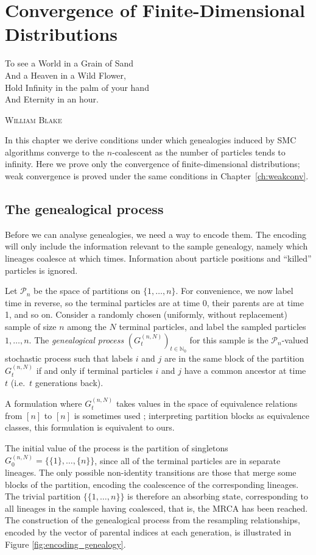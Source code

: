 \chapter{Convergence of Finite-Dimensional Distributions} %
\label{ch:limits}

\epigraph{
To see a World in a Grain of Sand\\
And a Heaven in a Wild Flower,\\
Hold Infinity in the palm of your hand\\
And Eternity in an hour.
}
{\textsc{William Blake}} 

In this chapter we derive conditions under which genealogies induced by SMC algorithms converge to the $n$-coalescent as the number of particles tends to infinity. Here we prove only the convergence of finite-dimensional distributions; weak convergence is proved under the same conditions in Chapter~\ref{ch:weakconv}.




\section{The genealogical process}
Before we can analyse genealogies, we need a way to encode them.
The encoding will only include the information relevant to the sample genealogy, namely which lineages coalesce at which times. Information about particle positions and ``killed'' particles is ignored.

Let $\mathcal{P}_n$ be the space of partitions on $\{1,\dots,n\}$.
For convenience, we now label time in reverse, so the terminal particles are at time 0, their parents are at time 1, and so on.
Consider a randomly chosen (uniformly, without replacement) sample of size $n$ among the $N$ terminal particles, and label the sampled particles $1,\dots,n$.
The \emph{genealogical process} $(G_t^{(n,N)})_{t\in\mathbb{N}_0}$ for this sample is the $\mathcal{P}_n$-valued stochastic process such that labels $i$ and $j$ are in the same block of the partition $G_t^{(n,N)}$ if and only if terminal particles $i$ and $j$ have a common ancestor at time $t$ (i.e.\ $t$ generations back).

A formulation where $G_t^{(n,N)}$ takes values in the space of equivalence relations from $[n]$ to $[n]$ is sometimes used \parencite[e.g.][]{mohle1999}; interpreting partition blocks as equivalence classes, this formulation is equivalent to ours.

The initial value of the process is the partition of singletons $G_0^{(n,N)} = \{ \{1\}, \dots, \{n\} \}$, since all of the terminal particles are in separate lineages.
The only possible non-identity transitions are those that merge some blocks of the partition, encoding the coalescence of the corresponding lineages.
The trivial partition $\{ \{1,\dots,n\} \}$ is therefore an absorbing state, corresponding to all lineages in the sample having coalesced, that is, the MRCA has been reached.
The construction of the genealogical process from the resampling relationships, encoded by the vector of parental indices at each generation, is illustrated in Figure \ref{fig:encoding_genealogy}.

